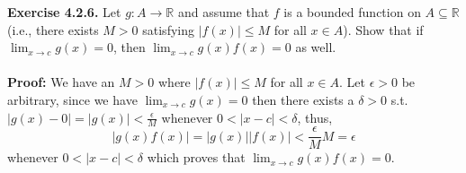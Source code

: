\documentclass{article}
\begin{document}
	\textbf{Exercise 4.2.6.} Let $g : A \to \mathbb{R}$ and assume that $f$ is a bounded function on $A \subseteq \mathbb{R}$(i.e., there exists $M > 0$ satisfying $|f(x)| \leq M$ for all $x \in A$). Show that if $\lim_{x \to c}g(x) = 0$, then $\lim_{x \to c}g(x)f(x) = 0$ as well. \\ \\
	\textbf{Proof:} We have an $M > 0$ where $|f(x)| \leq M$ for all $x \in A$. Let $\epsilon > 0$ be arbitrary, since we have $\lim_{x \to c}g(x) = 0$ then there exists a $\delta > 0$ s.t. $|g(x) - 0| = |g(x)| < \frac{\epsilon}{M}$ whenever $0 < |x - c| < \delta$, thus,
	$$|g(x)f(x)| = |g(x)||f(x)| < \frac{\epsilon}{M}M = \epsilon$$ 
	whenever $0 < |x - c| < \delta$ which proves that $\lim_{x \to c}g(x)f(x) = 0$. 
\end{document}
